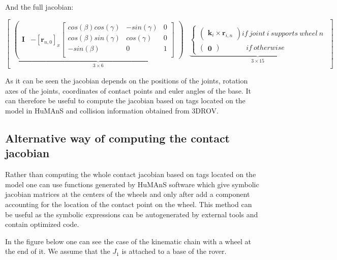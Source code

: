 \documentclass[a4paper]{article}
\begin{document}
\noindent And the full jacobian:

\begin{equation}
\begin{bmatrix}\underbrace{\begin{pmatrix} \boldsymbol{I} & - [\boldsymbol{r}_{n, 0}]_{x}\begin{bmatrix} cos(\beta)cos(\gamma) & -sin(\gamma) & 0 \\ 
                        cos(\beta)sin(\gamma) & cos(\gamma) & 0 \\
                        -sin(\beta) & 0 & 1 \\  \end{bmatrix}    \end{pmatrix}}_{3 \times 6} & \underbrace{\begin{cases}
        \begin{pmatrix} \boldsymbol{k}_{i} \times \boldsymbol{r}_{i, n} \end{pmatrix} if \ joint \ i \ supports \  wheel \ n \\
        \begin{pmatrix} \boldsymbol{0} \end{pmatrix} \ \ \ \ \ \ \ \ \ \ \ \ \ \ \ \ if \  otherwise
\end{cases}}_{3 \times 15}
\end{bmatrix}
\end{equation}

\noindent As it can be seen the jacobian depends on the positions of the joints, rotation axes of the joints, coordinates of contact points and euler angles of the base. It can therefore be useful to
compute the jacobian based on tags located on the model in HuMAnS and collision information obtained from 3DROV.

\subsection{Alternative way of computing the contact jacobian}

\noindent Rather than computing the whole contact jacobian based on tags located on the model one can use functions generated by HuMAnS software which give symbolic jacobian matrices at the centers of the wheels
and only after add a component accounting for the location of the contact point on the wheel. This method can be useful as the symbolic expressions can be autogenerated by external tools and contain optimized code.  

\noindent In the figure below one can see the case of the kinematic chain with a wheel at the end of it. We assume that the $J_{1}$ is attached to a base of the rover.  
\end{document}
